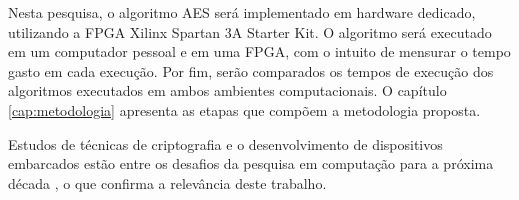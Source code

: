 \documentclass[
	12pt,				%
	twoside,			%
	a4paper,			%
	chapter=TITLE,		%
	english,			%
	brazil				%
	]{tcc}
\begin{document}
Nesta pesquisa, o algoritmo AES será implementado em hardware dedicado, utilizando a FPGA Xilinx Spartan 3A Starter Kit. O algoritmo será executado em um computador pessoal e em uma FPGA, com o intuito de mensurar o tempo gasto em cada execução. Por fim, serão comparados os tempos de execução dos algoritmos executados em ambos ambientes computacionais. O capítulo \ref{cap:metodologia} apresenta as etapas que compõem a metodologia proposta.


Estudos de técnicas de criptografia e o desenvolvimento de dispositivos embarcados estão entre os desafios da pesquisa em computação para a próxima década \cite{grandesDesafios2013}, o que confirma a relevância deste trabalho.






\end{document}
